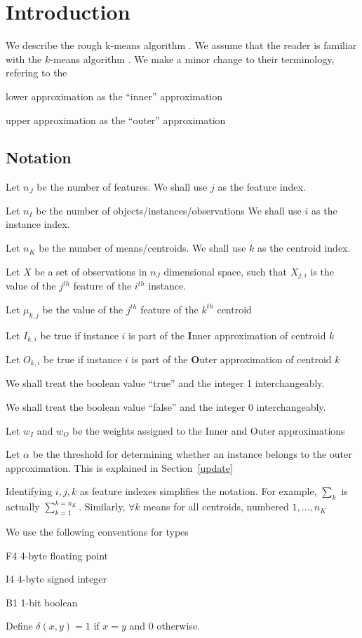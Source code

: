 
\section{Introduction}

We describe the rough k-means algorithm \cite{Peters2012}. 
We assume that the reader is familiar with the \(k\)-means algorithm
\cite{Hastie2009}. We make a minor change to their terminology, 
refering to the 
\bi
\item lower approximation as the ``inner'' approximation
\item upper approximation as the ``outer'' approximation
\ei

\subsection{Notation}

\be
\item Let \(n_J\) be the number of features. 
We shall use \(j\) as the feature index. 
\item Let \(n_I\) be the number of objects/instances/observations
We shall use \(i\) as the instance index. 
\item Let \(n_K\) be the number of means/centroids.
We shall use \(k\) as the centroid index. 
\item Let \(X\) be a set of observations in \(n_J\) dimensional space, 
such that \(X_{j, i}\) is the value of the \(j^{th}\) feature of 
the \(i^{th}\) instance. 
\item Let \(\mu_{k, j}\) be the value of the \(j^{th}\) feature of the \(k^{th}\)
centroid
\item Let \(I_{k, i}\) be true if instance \(i\) is part of the 
{\bf I}nner approximation of centroid \(k\)
\item Let \(O_{k, i}\) be true if instance \(i\) is part of the 
{\bf O}uter approximation of centroid \(k\)
\item We shall treat the boolean value ``true'' and the integer
1 interchangeably. 
\item We shall treat the boolean value ``false'' and the integer
0 interchangeably. 
\item Let \(w_I\) and \(w_O\) be the weights assigned to the Inner and Outer
approximations
\item Let \(\alpha\) be the threshold for determining whether an instance
belongs to the outer approximation. This is explained in 
Section~\ref{update}
\item Identifying \(i, j, k\) as feature indexes simplifies the notation. For
example, \(\sum_k\) is actually \(\sum_{k=1}^{k=n_K}\). Similarly, \(\forall k\)
means for all centroids, numbered \(1, \ldots, n_K\)
\item We use the following conventions for types
\bd 
\item F4 4-byte floating point
\item I4 4-byte signed integer
\item B1 1-bit boolean
\ed
\item Define \(\delta(x, y) = 1 \) if \(x = y\) and 0 otherwise.
\ee

